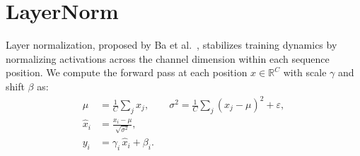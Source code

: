 \documentclass[letterpaper, 10 pt, conference]{ieeeconf}
\newcommand{\R}{\mathbb{R}}
\theoremstyle{definition}
\begin{document}
\section{LayerNorm}\label{sec:layernorm}

Layer normalization, proposed by Ba et al.\ \cite{layernorm}, stabilizes training dynamics by normalizing activations across the channel dimension within each sequence position. We compute the forward pass at each position $x \in \R^{C}$ with scale $\gamma$ and shift $\beta$ as:
\begin{equation}
  \begin{aligned}
    \mu       & = \tfrac{1}{C}\sum_j x_j,
    \qquad
    \sigma^2 = \tfrac{1}{C}\sum_j (x_j - \mu)^2 + \varepsilon, \\
    \hat{x}_i & = \frac{x_i - \mu}{\sqrt{\sigma^2}},           \\
    y_i       & = \gamma_i\,\hat{x}_i + \beta_i.
  \end{aligned}
  \label{eq:ln-fwd}
\end{equation}
\end{document}
